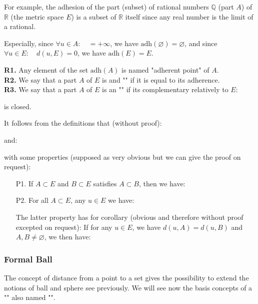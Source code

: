\begin{enumerate}
		For example, the adhesion of the part (subset) of rational numbers $\mathbb{Q}$ (part $A$) of $\mathbb{R}$ (the metric space $E$) is a subset of $\mathbb{R}$ itself since any real number is the limit of a rational.
		
		Especially, since $\forall u\in A:\quad =+\infty$, we have $\text{adh}(\varnothing)=\varnothing$, and since $\forall u\in E:\quad d(u,E)=0$, we have $\text{adh}(E)=E$.
		
		\begin{tcolorbox}[title=Remarks,arc=10pt,breakable,drop lifted shadow,
  skin=enhanced,
  skin first is subskin of={enhancedfirst}{arc=10pt,no shadow},
  skin middle is subskin of={enhancedmiddle}{arc=10pt,no shadow},
  skin last is subskin of={enhancedlast}{drop lifted shadow}]
		\textbf{R1.} Any element of the set $\text{adh}(A)$ is named "adherent point" of $A$.\\
		
		\textbf{R2.} We say that a part $A$ of $E$ is and "" if it is equal to its adherence.\\
		
		\textbf{R3.} We say that a part $A$ of $E$ is an "" if its complementary relatively to $E$:
		
		is closed.
		\end{tcolorbox}	
	\end{enumerate}
	It follows from the definitions that (without proof):
	
	and:
	
	with some properties (supposed as very obvious but we can give the proof on request):
	\begin{enumerate}
		\item[P1.] If $A\subset E$ and $B\subset E$ satisfies $A\subset B$, then we have:
		
		
		\item[P2.] For all $A\subset E$, any $u\in E$ we have:
		
		The latter property has for corollary (obvious and therefore without proof excepted on request):
		If for any $u\in E$, we have $d(u,A)=d(u,B)$ and $A,B\neq \varnothing$, we then have:
		
	\end{enumerate}
	
	\subsubsection{Formal Ball}
	The concept of distance from a point to a set gives the possibility to extend the notions of ball and sphere see previously. We will see now the basis concepts of a "" also named "".
	
